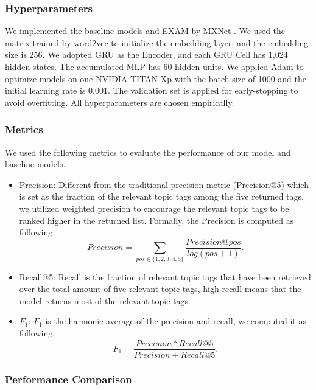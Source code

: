 \documentclass[letterpaper]{article} %
\begin{document}
\subsubsection{Hyperparameters}
We implemented the baseline models and EXAM by MXNet \cite{MXNet}. We used the matrix trained by word2vec \cite{Word2vec} to initialize the embedding layer, and the embedding size is 256. We adopted GRU as the Encoder, and each GRU Cell has 1,024 hidden states. The accumulated MLP has 60 hidden units. We applied Adam \cite{adam} to optimize models on one NVIDIA TITAN Xp with the batch size of 1000 and the initial learning rate is 0.001. The validation set is applied for early-stopping to avoid overfitting. All hyperparameters are chosen empirically.
\subsubsection{Metrics}
We used the following metrics to evaluate the performance of our model and baseline models.


\begin{itemize}
\item Precision: Different from the traditional precision metric (Precision@5) which is set as the fraction of the relevant topic tags among the five returned tags, we utilized weighted precision to encourage the relevant topic tags to be ranked higher in the returned list. Formally, the Precision is computed as following,
\begin{equation}
Precision = \sum\limits_{pos \in \{1,2,3,4,5\}} \frac{Precision @ pos}{log(pos + 1)}.
\end{equation}
\item Recall@5: Recall is the fraction of relevant topic tags that have been retrieved over the total amount of five relevant topic tags,  high recall means that the model returns most of the relevant topic tags. 
\item $F_{1}$: $F_{1}$ is the harmonic average of the precision and recall, we computed it as following,
\begin{equation}
F_{1} = \frac{Precision * Recall@5}{Precision + Recall@5}. 
\end{equation}
\end{itemize}

\subsubsection{Performance Comparison}
\end{document}
